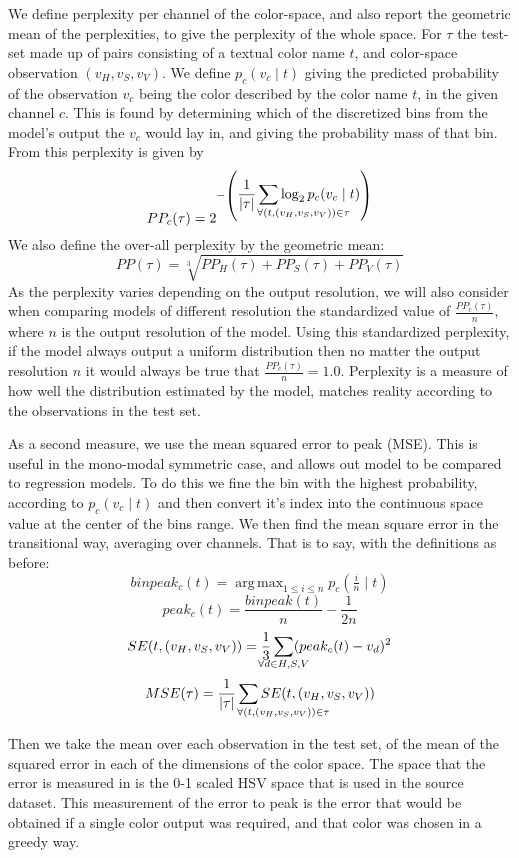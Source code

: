 \documentclass[11pt,letterpaper]{article}
\DeclareMathOperator*{\argmax}{arg\,max}
\begin{document}
We define perplexity per channel of the color-space, and also report the geometric mean of the perplexities, to give the perplexity of the whole space.
For $\tau$ the test-set made up of pairs consisting of a textual color name $t$, and color-space observation $(v_{H}, v_{S}, v_{V})$.
We define $p_{c}(v_{c}\mid t)$ giving the predicted probability of the observation $v_{c}$ being the color described by the color name $t$, in the given channel ${c}$.
This is found by determining which of the discretized bins from the model's output the $v_{c}$ would lay in, and giving the probability mass of that bin.
From this perplexity is given by
\[
 PP_{c}(\tau) = 2^{-\left(
 	\displaystyle\frac{1}{|\tau|} 
 	\displaystyle\sum_{\mathclap{\qquad\qquad\quad
	 		\forall(t,(v_{H}, v_{S}, v_{V})) \in \tau}}
 	 \log_2 p_{c}(v_{c}\mid t)\right)}
\]
We also define the over-all perplexity by the geometric mean: 
\[
PP(\tau) = \sqrt[3]{PP_H(\tau)+PP_S(\tau)+PP_V(\tau)}
\]
As the perplexity varies depending on the output resolution,
we will also consider when comparing models of different resolution the standardized value of $\frac{PP_c(\tau)}{n}$, where $n$ is the output resolution of the model.
Using this standardized perplexity, if the model always output a uniform distribution then no matter the output resolution $n$ it would always be true that  $\frac{PP_c(\tau)}{n}=1.0$.
Perplexity is a measure of how well the distribution estimated by the model, matches reality according to the observations in the test set.


As a second measure, we use the mean squared error to peak (MSE).
This is useful in the mono-modal symmetric case, and allows out model to be compared to regression models.
To do this we fine the bin with the highest probability, according to $p_c(v_c\mid t)$ and then convert it's index into the continuous space value at the center of the bins range.
We then find the mean square error in the transitional way, averaging over channels.
That is to say, with the definitions as before:
\[
binpeak_c(t)=\argmax_{1\le i \le n}{p_c\left(\tfrac{i}{n} \mid t\right)}
\]
\[
peak_c(t)=\frac{binpeak(t)}{n} - \frac{1}{2n}
\]
\[
SE(t, (v_{H}, v_{S}, v_{V})) = \frac{1}{3}
	\sum_{\mathclap{\forall d\in{H,S,V}}} (peak_c(t) - v_d)^2
\]
\[
MSE(\tau) =\frac{1}{|\tau|}
	\sum_{\mathclap{\qquad\qquad\quad
		\forall(t,(v_{H}, v_{S}, v_{V})) \in \tau}}
	 SE(t,(v_{H}, v_{S}, v_{V}))
\]

Then we take the mean over each observation in the test set, of the mean of the squared error in each of the dimensions of the color space.
The space that the error is measured in is the 0-1 scaled HSV space that is used in the source dataset.
This measurement of the error to peak is the error that would be obtained if a single color output was required, and that color was chosen in a greedy way.
\end{document}

